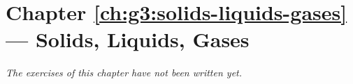 \section*{Chapter \ref{ch:g3:solids-liquids-gases} --- Solids, Liquids, Gases}


\emph{The exercises of this chapter have not been written yet.}
